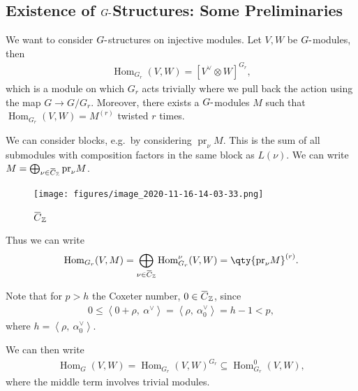 \hypertarget{existence-of-ghbox-structures-some-preliminaries}{%
\subsection{\texorpdfstring{Existence of \(G{\hbox{-}}\)Structures: Some
Preliminaries}{Existence of G\{\textbackslash hbox\{-\}\}Structures: Some Preliminaries}}\label{existence-of-ghbox-structures-some-preliminaries}}

We want to consider \(G{\hbox{-}}\)structures on injective modules. Let
\(V, W\) be \(G{\hbox{-}}\)modules, then
\begin{align*}  
{\operatorname{Hom}}_{G_r}(V, W) = [V^\vee\otimes W]^{G_r}
,\end{align*}
which is a module on which \(G_r\) acts trivially where we pull back the
action using the map \(G \to G/G_r\). Moreover, there exists a
\(G{\hbox{-}}\)modules \(M\) such that
\({\operatorname{Hom}}_{G_r}(V, W) = M^{(r)}\) twisted \(r\) times.

We can consider blocks, e.g.~by considering
\({\operatorname{pr}}_\nu M\). This is the sum of all submodules with
composition factors in the same block as \(L(\nu)\). We can write
\(M = \bigoplus_{\nu\in \mkern 1.5mu\overline{\mkern-1.5muC\mkern-1.5mu}\mkern 1.5mu_{\mathbb{Z}}} {\operatorname{pr}}_\nu M\).

\begin{figure}
\centering
\texttt{[image: figures/image\_2020-11-16-14-03-33.png]}
\caption{\(\mkern 1.5mu\overline{\mkern-1.5muC\mkern-1.5mu}\mkern 1.5mu_{\mathbb{Z}}\)}
\end{figure}

Thus we can write
\begin{align*}  
{\operatorname{Hom}}_{G_r}(V, M) = \bigoplus_{\nu\in \mkern 1.5mu\overline{\mkern-1.5muC\mkern-1.5mu}\mkern 1.5mu_{\mathbb{Z}}} {\operatorname{Hom}}_{G_r}^\nu(V, W) = \qty{ {\operatorname{pr}}_\nu M }^{(r)}
.\end{align*}

Note that for \(p>h\) the Coxeter number,
\(0\in \mkern 1.5mu\overline{\mkern-1.5muC\mkern-1.5mu}\mkern 1.5mu_{\mathbb{Z}}\),
since
\begin{align*}  
0 \leq {\left\langle {0+\rho},~{\alpha^\vee} \right\rangle} = {\left\langle {\rho},~{\alpha_0^\vee} \right\rangle} = h-1 < p
,\end{align*}
where \(h = {\left\langle {\rho},~{\alpha_0^\vee} \right\rangle}\).

We can then write
\begin{align*}  
{\operatorname{Hom}}_G(V, W) = {\operatorname{Hom}}_{G_r}(V, W)^{G_r} \subseteq {\operatorname{Hom}}_{G_r}^0(V, W)
,\end{align*}
where the middle term involves trivial modules.

